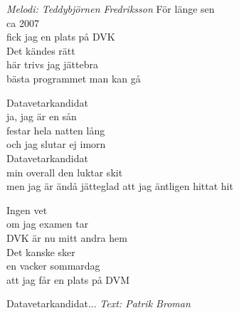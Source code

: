 {\footnotesize\textit{Melodi: Teddybjörnen Fredriksson}}
\vspace{10pt}
För länge sen\\
ca 2007\\
fick jag en plats på DVK\\
Det kändes rätt\\
här trivs jag jättebra\\
bästa programmet man kan gå\par
\vspace{10pt}
Datavetarkandidat\\
ja, jag är en sån\\
festar hela natten lång\\
och jag slutar ej imorn\\
Datavetarkandidat\\
min overall den luktar skit\\
men jag är ändå jätteglad att jag äntligen hittat hit\par
\vspace{10pt}
Ingen vet\\
om jag examen tar\\
DVK är nu mitt andra hem\\
Det kanske sker\\
en vacker sommardag\\
att jag får en plats på DVM\par
\vspace{10pt}
Datavetarkandidat...
\vspace{10pt}
{\footnotesize\textit{Text: Patrik Broman}}
